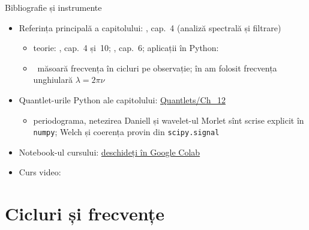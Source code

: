 \begin{frame}{Bibliografie și instrumente}
\itemsize{\small}
\begin{itemize}
    \item Referința principală a capitolului: , cap.~4 (analiză spectrală și filtrare)
    \begin{itemize}
        \item teorie: , cap.~4 și~10; , cap.~6; aplicații în Python: 
        \item {}\ măsoară frecvența în cicluri pe observație; în  am folosit frecvența unghiulară $\lambda = 2\pi\nu$
    \end{itemize}
    \item Quantlet-urile Python ale capitolului: \href{https://github.com/danpele/Time-Series-Analysis/tree/main/Quantlets/Ch_12}{Quantlets/Ch\_12}
    \begin{itemize}
        \item periodograma, netezirea Daniell și wavelet-ul Morlet sînt scrise explicit în \texttt{numpy}; Welch și coerența provin din \texttt{scipy.signal}
    \end{itemize}
    \item Notebook-ul cursului: \href{\colaburl{notebooks/EN/chapter12_lecture_notebook.ipynb}}{deschideți în Google Colab}
    \item Curs video: 
\end{itemize}
\end{frame}


\section{Cicluri și frecvențe}

